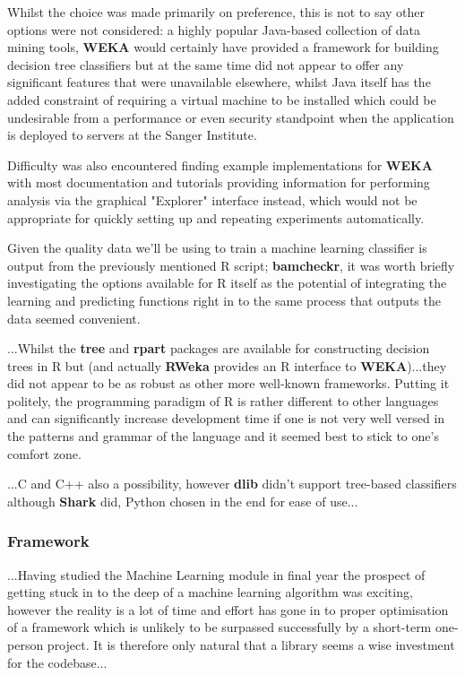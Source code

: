 Whilst the choice was made primarily on preference, this is not to say other
options were not considered: a highly popular Java-based collection of data
mining tools, \textbf{WEKA}\citep{weka} would certainly have provided a framework for
building decision tree classifiers but at the same time did not appear to offer
any significant features that were unavailable elsewhere, whilst Java itself has
the added constraint of requiring a virtual machine to be installed which could
be undesirable from a performance or even security standpoint when the
application is deployed to servers at the Sanger Institute.


Difficulty was also encountered finding example implementations for \textbf{WEKA}
with most documentation and tutorials providing information for performing
analysis via the graphical "Explorer" interface instead, which would not be
appropriate for quickly setting up and repeating experiments automatically.

Given the quality data we'll be using to train a machine learning classifier is
output from the previously mentioned R script; \textbf{bamcheckr}, it was worth
briefly investigating the options available for R itself as the potential of
integrating the learning and predicting functions right in to the same process
that outputs the data seemed convenient.

...Whilst the \textbf{tree}\citep{man:rtree} and
\textbf{rpart}\citep{man:rpart} packages are available for constructing
decision trees in R but (and actually \textbf{RWeka} provides an R interface to
\textbf{WEKA})...they did not appear to be as robust as other more well-known
frameworks. Putting it politely, the programming paradigm of R\citep{man:R} is rather
different to other languages and can significantly increase development time if
one is not very well versed in the patterns and grammar of the language and it
seemed best to stick to one's comfort zone.

...C and C++ also a possibility, however \textbf{dlib} didn't support tree-based
classifiers although \textbf{Shark} did, Python chosen in the end for ease of
use...


\subsubsection{Framework}
...Having studied the Machine Learning module in final year the prospect of
getting stuck in to the deep of a machine learning algorithm was exciting,
however the reality is a lot of time and effort has gone in to proper
optimisation of a framework which is unlikely to be surpassed successfully by a
short-term one-person project. It is therefore only natural that a library seems
a wise investment for the codebase...

